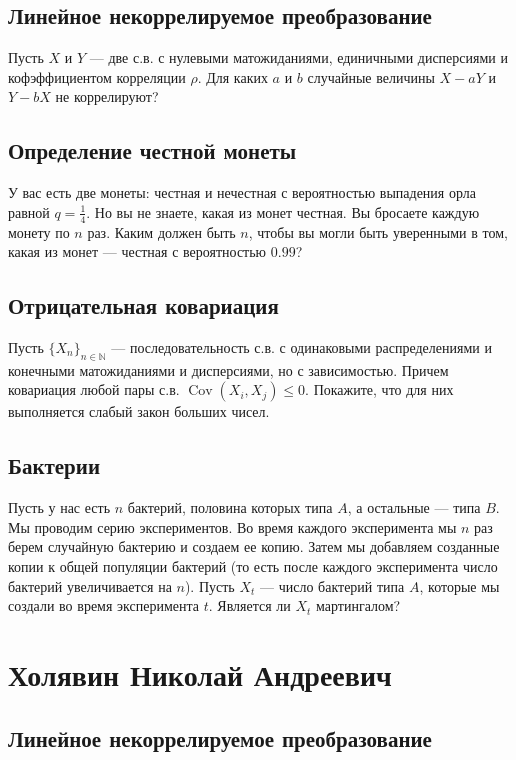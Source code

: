 \documentclass[12pt]{article}
\newcommand\N{\mathbb{N}}
\DeclareMathOperator{\Cov}{Cov}
\begin{document}
\subsection{Линейное некоррелируемое преобразование}

Пусть $X$ и $Y$ --- две с.в. с нулевыми матожиданиями, единичными дисперсиями и кофэффициентом корреляции $\rho$. Для каких $a$ и $b$ случайные величины $X - aY$ и $Y - bX$ не коррелируют?


\subsection{Определение честной монеты}

У вас есть две монеты: честная и нечестная с вероятностью выпадения орла равной $q = \frac{1}{4}$. Но вы не знаете, какая из монет честная. Вы бросаете каждую монету по $n$ раз. Каким должен быть $n$, чтобы вы могли быть уверенными в том, какая из монет --- честная с вероятностью $0.99$? 


\subsection{Отрицательная ковариация}

Пусть $\{X_n\}_{n \in \N}$ --- последовательность с.в. с одинаковыми распределениями и конечными матожиданиями и дисперсиями, но с зависимостью. Причем ковариация любой пары с.в. $\Cov(X_i, X_j) \le 0$. Покажите, что для них выполняется слабый закон больших чисел.


\subsection{Бактерии}

Пусть у нас есть $n$ бактерий, половина которых типа $A$, а остальные --- типа $B$. Мы проводим серию экспериментов. Во время каждого эксперимента мы $n$ раз берем случайную бактерию и создаем ее копию. Затем мы добавляем созданные копии к общей популяции бактерий (то есть после каждого эксперимента число бактерий увеличивается на $n$). Пусть $X_t$ --- число бактерий типа $A$, которые мы создали во время эксперимента $t$. Является ли $X_t$ мартингалом?


\newpage
\section{Холявин Николай Андреевич}

\subsection{Линейное некоррелируемое преобразование}
\end{document}
